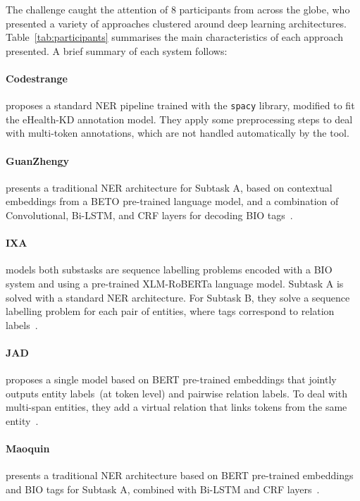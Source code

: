 \documentclass[a4paper,11pt,twocolumn,twoside]{article}
\begin{document}
The challenge caught the attention of 8 participants from across the globe,
who presented a variety of approaches clustered around deep learning architectures.
Table~\ref{tab:participants} summarises the main characteristics of each approach presented.
A brief summary of each system follows:

\paragraph{Codestrange} proposes a standard NER pipeline trained with the \texttt{spacy} library, modified to fit the eHealth-KD annotation model. They apply some preprocessing steps to deal with multi-token annotations, which are not handled automatically by the tool.

\paragraph{GuanZhengy} presents a traditional NER architecture for Subtask A, based on contextual embeddings from a BETO pre-trained language model, and a combination of Convolutional, Bi-LSTM, and CRF layers for decoding BIO tags~\cite{GuanZhengyi2021}.

\paragraph{IXA} models both substasks are sequence labelling problems encoded with a BIO system and using a pre-trained XLM-RoBERTa language model. Subtask A is solved with a standard NER architecture. For Subtask B, they solve a sequence labelling problem for each pair of entities, where tags correspond to relation labels~\cite{edgarandres2021}.

\paragraph{JAD} proposes a single model based on BERT pre-trained embeddings that jointly outputs entity labels~(at token level) and pairwise relation labels. To deal with multi-span entities, they add a virtual relation that links tokens from the same entity~\cite{JAD2021}.

\paragraph{Maoquin} presents a traditional NER architecture based on BERT pre-trained embeddings and BIO tags for Subtask A, combined with Bi-LSTM and CRF layers~\cite{Maoqin2021}.
\end{document}
